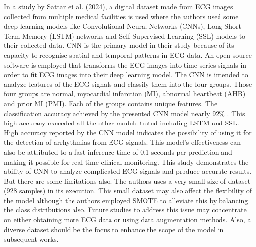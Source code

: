 In a study by Sattar et al.\cite{s24082484} (2024), a digital dataset made from ECG images collected from multiple medical facilities is used where the authors used some deep learning models like Convolutional Neural Networks (CNNs), Long Short-Term Memory (LSTM) networks and Self-Supervised Learning (SSL) models to their collected data. CNN is the primary model in their study because of its capacity to recognise spatial and temporal patterns in ECG data. An open-source software is employed that transforms the ECG images into time-series signals in order to fit ECG images into their deep learning model. The CNN is intended to analyze features of the ECG signals and classify them into the four groups. Those four groups are normal, myocardial infarction (MI), abnormal heartbeat (AHB) and prior MI (PMI). Each of the groups contains unique features. The classification accuracy achieved by the presented CNN model nearly 92\% . This high accuracy exceeded all the other models tested including LSTM and SSL. High accuracy reported by the CNN model indicates the possibility of using it for the detection of arrhythmias from ECG signals. This model’s effectiveness can also be attributed to a fast inference time of 0.1 seconds per prediction and making it possible for real time clinical monitoring. This study demonstrates the ability of CNN to analyze complicated ECG signals and produce accurate results. But there are some limitations also. The authors uses a very small size of dataset (928 samples) in its execution. This small dataset may also affect the flexibility of the model although the authors employed SMOTE to alleviate this by balancing the class distributions also.  Future studies to address this issue may concentrate on either obtaining more ECG data or using data augmentation methods.  Also, a diverse dataset should be the focus to enhance the scope of the model in subsequent works.
\vspace{0.5cm}


